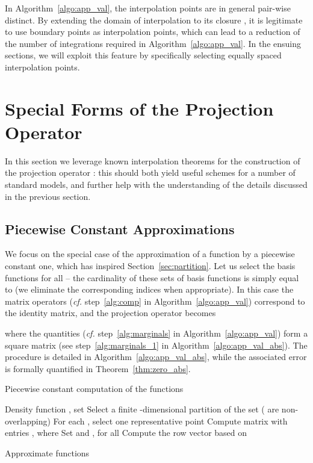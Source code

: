 \documentclass{LMCS}
\def\cf{{\em cf.}\xspace}
\begin{document}
In Algorithm~\ref{algo:app_val}, 
the interpolation points  are in general pair-wise distinct. 
By extending the domain of interpolation  to its closure , 
it is legitimate to use boundary points as interpolation points, 
which can lead to a reduction of the number of integrations required in Algorithm~\ref{algo:app_val}.
In the ensuing sections, we will exploit this feature by specifically selecting equally spaced interpolation points.

\section{Special Forms of the Projection Operator} 
\label{sec:proj}

In this section we leverage known interpolation theorems for the construction of the projection operator : 
this should both yield useful schemes for a number of standard models, 
and further help with the understanding of the details discussed in the previous section.

\subsection{Piecewise Constant Approximations}
\label{subsec:PWC}

We focus on the special case of the approximation of a function by a piecewise constant one, 
which has inspired Section~\ref{sec:partition}.
Let us select the basis functions  for all  -- 
the cardinality of these sets of basis functions is simply equal to   
(we eliminate the corresponding indices when appropriate).  
In this case the matrix operators  (\cf step~\ref{alg:comp} in Algorithm~\ref{algo:app_val}) correspond to the identity matrix, 
and the projection operator  becomes 

where the quantities  (\cf step~\ref{alg:marginals} in Algorithm~\ref{algo:app_val}) form a square matrix 
(see step~\ref{alg:marginals_1} in Algorithm~\ref{algo:app_val_abs}).   
The procedure is detailed in Algorithm~\ref{algo:app_val_abs},
while the associated error is formally quantified in Theorem~\ref{thm:zero_abs}.
\begin{algorithm}
\caption{Piecewise constant computation of the functions }  
\label{algo:app_val_abs}
\begin{center}
\begin{algorithmic}[1]
\REQUIRE 
Density function , set 
\STATE
Select a finite -dimensional partition of the set 
( are non-overlapping)
\STATE
For each , select one representative point 
\STATE \label{alg:marginals_1}
Compute matrix  with entries , where 
\STATE Set  and , for all 
\IF{}
\STATE
Compute the row vector  based on 
\STATE

\ENDIF
\ENSURE
Approximate functions 
\end{algorithmic}
\end{center}
\end{algorithm}
\end{document}
